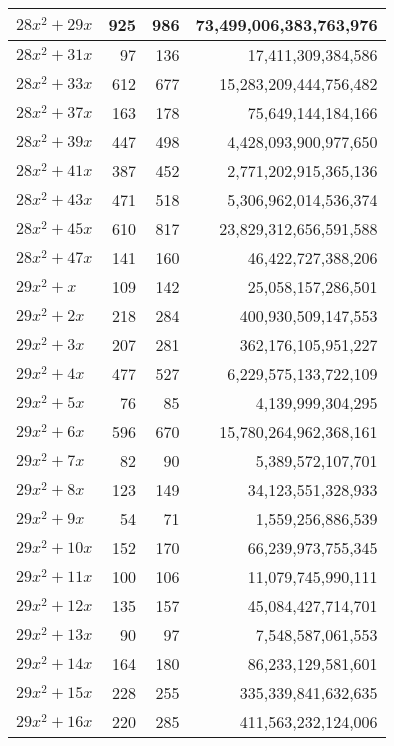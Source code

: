 \documentclass[a4paper]{amsproc}
\theoremstyle{plain}
\begin{document}
\begin{longtable}{ | l | r | r | r | }
$28x^2 + 29x$ & 925 & 986 & 73{,}499{,}006{,}383{,}763{,}976 \\ \hline
$28x^2 + 31x$ & 97 & 136 & 17{,}411{,}309{,}384{,}586 \\ \hline
$28x^2 + 33x$ & 612 & 677 & 15{,}283{,}209{,}444{,}756{,}482 \\ \hline
$28x^2 + 37x$ & 163 & 178 & 75{,}649{,}144{,}184{,}166 \\ \hline
$28x^2 + 39x$ & 447 & 498 & 4{,}428{,}093{,}900{,}977{,}650 \\ \hline
$28x^2 + 41x$ & 387 & 452 & 2{,}771{,}202{,}915{,}365{,}136 \\ \hline
$28x^2 + 43x$ & 471 & 518 & 5{,}306{,}962{,}014{,}536{,}374 \\ \hline
$28x^2 + 45x$ & 610 & 817 & 23{,}829{,}312{,}656{,}591{,}588 \\ \hline
$28x^2 + 47x$ & 141 & 160 & 46{,}422{,}727{,}388{,}206 \\ \hline
$29x^2 + x$ & 109 & 142 & 25{,}058{,}157{,}286{,}501 \\ \hline
$29x^2 + 2x$ & 218 & 284 & 400{,}930{,}509{,}147{,}553 \\ \hline
$29x^2 + 3x$ & 207 & 281 & 362{,}176{,}105{,}951{,}227 \\ \hline
$29x^2 + 4x$ & 477 & 527 & 6{,}229{,}575{,}133{,}722{,}109 \\ \hline
$29x^2 + 5x$ & 76 & 85 & 4{,}139{,}999{,}304{,}295 \\ \hline
$29x^2 + 6x$ & 596 & 670 & 15{,}780{,}264{,}962{,}368{,}161 \\ \hline
$29x^2 + 7x$ & 82 & 90 & 5{,}389{,}572{,}107{,}701 \\ \hline
$29x^2 + 8x$ & 123 & 149 & 34{,}123{,}551{,}328{,}933 \\ \hline
$29x^2 + 9x$ & 54 & 71 & 1{,}559{,}256{,}886{,}539 \\ \hline
$29x^2 + 10x$ & 152 & 170 & 66{,}239{,}973{,}755{,}345 \\ \hline
$29x^2 + 11x$ & 100 & 106 & 11{,}079{,}745{,}990{,}111 \\ \hline
$29x^2 + 12x$ & 135 & 157 & 45{,}084{,}427{,}714{,}701 \\ \hline
$29x^2 + 13x$ & 90 & 97 & 7{,}548{,}587{,}061{,}553 \\ \hline
$29x^2 + 14x$ & 164 & 180 & 86{,}233{,}129{,}581{,}601 \\ \hline
$29x^2 + 15x$ & 228 & 255 & 335{,}339{,}841{,}632{,}635 \\ \hline
$29x^2 + 16x$ & 220 & 285 & 411{,}563{,}232{,}124{,}006 \\ \hline

\end{longtable}
\end{document}
